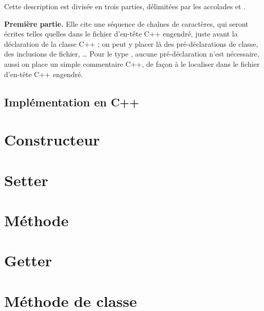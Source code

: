 Cette description est divisée en trois parties, délimitées par les accolades \galgas{\{} et \galgas{\}}.

\textbf{Première partie.} Elle cite une séquence de chaînes de caractères, qui seront écrites telles quelles dans le fichier d'en-tête C++ engendré, juste avant la déclaration de la classe C++ ; on peut y placer là des pré-déclarations de classe, des inclusions de fichier, … Pour le type , aucune pré-déclaration n'est nécessaire, aussi on place un simple commentaire C++, de façon à le localiser dans le fichier d'en-tête C++ engendré.

\subsection{Implémentation en C++}






\section{Constructeur}


\section{Setter}


\section{Méthode}


\section{Getter}


\section{Méthode de classe}


